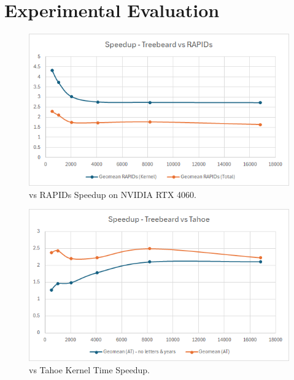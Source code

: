 \section{Experimental Evaluation}


\begin{figure}[htb]
  \centering
  \includegraphics[width=\linewidth]{figures/TBvsRAPIDs_4060_Speedup.png}
  \caption{\Treebeard{} vs RAPIDs Speedup on NVIDIA RTX 4060.}
  \label{Fig:TBvsRAPIDs_4060_Speedup}
\end{figure}

\begin{figure}[htb]
  \centering
  \includegraphics[width=\linewidth]{figures/TBvsTahoe_4060_KernelTimeSpeedup.png}
  \caption{\Treebeard{} vs Tahoe Kernel Time Speedup.}
  \label{Fig:TBvsTahoe_4060_KernelTimeSpeedup}
\end{figure}

